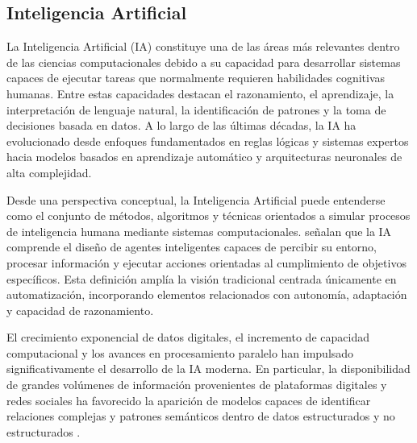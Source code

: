 
\subsection{Inteligencia Artificial}

La Inteligencia Artificial (IA) constituye una de las áreas más relevantes dentro de las ciencias computacionales debido a su capacidad para desarrollar sistemas capaces de ejecutar tareas que normalmente requieren habilidades cognitivas humanas. Entre estas capacidades destacan el razonamiento, el aprendizaje, la interpretación de lenguaje natural, la identificación de patrones y la toma de decisiones basada en datos. A lo largo de las últimas décadas, la IA ha evolucionado desde enfoques fundamentados en reglas lógicas y sistemas expertos hacia modelos basados en aprendizaje automático y arquitecturas neuronales de alta complejidad.

Desde una perspectiva conceptual, la Inteligencia Artificial puede entenderse como el conjunto de métodos, algoritmos y técnicas orientados a simular procesos de inteligencia humana mediante sistemas computacionales. \cite{bk_russell2009intart} señalan que la IA comprende el diseño de agentes inteligentes capaces de percibir su entorno, procesar información y ejecutar acciones orientadas al cumplimiento de objetivos específicos. Esta definición amplía la visión tradicional centrada únicamente en automatización, incorporando elementos relacionados con autonomía, adaptación y capacidad de razonamiento.

El crecimiento exponencial de datos digitales, el incremento de capacidad computacional y los avances en procesamiento paralelo han impulsado significativamente el desarrollo de la IA moderna. En particular, la disponibilidad de grandes volúmenes de información provenientes de plataformas digitales y redes sociales ha favorecido la aparición de modelos capaces de identificar relaciones complejas y patrones semánticos dentro de datos estructurados y no estructurados \parencite{bk_russell2004intart}.

